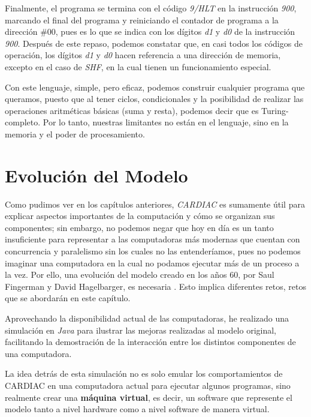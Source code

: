 \documentclass[letterpaper,12pt,oneside]{book}
\begin{document}
    Finalmente, el programa se termina con el código  \textit{9/HLT} en la instrucción \textit{900}, marcando el
	final del programa y reiniciando el contador de programa
	a la dirección \#00, pues es lo que se indica con los dígitos \textit{d1} y \textit{d0} de la instrucción \textit{900}. Después de este repaso, podemos constatar que, en casi todos los códigos de operación, los dígitos \textit{d1} y \textit{d0} hacen
	referencia a una dirección de memoria, excepto en el caso de \textit{SHF}, en la cual tienen un funcionamiento especial.
	
	Con este lenguaje, simple, pero eficaz, podemos construir cualquier programa que queramos,
	puesto que al tener ciclos, condicionales y la posibilidad de realizar
	las operaciones aritméticas básicas (suma y resta), podemos
	decir que es Turing-completo. Por lo tanto, nuestras limitantes no están en el lenguaje, sino en la memoria y el poder de procesamiento.
	
	
	

	\clearpage	
	
\chapter{Evolución del Modelo}  %

	Como pudimos ver en los capítulos anteriores, \textit{CARDIAC} es sumamente útil para explicar aspectos importantes de la computación y cómo se organizan sus 	
	componentes; sin embargo, no podemos negar que hoy en día es un tanto insuficiente para representar a las computadoras más modernas que cuentan con
	concurrencia y paralelismo sin los cuales no las entenderíamos, pues no podemos imaginar una computadora en la cual no podamos 	
	ejecutar más de un proceso a la vez. Por ello, una evolución del modelo creado en los años 60, por Saul Fingerman y David Hagelbarger,  es
	necesaria \cite{fingerman_instruction_1968}. Esto implica diferentes retos, retos que se abordarán en este capítulo.
	
	Aprovechando
	la disponibilidad actual de las computadoras, he realizado una simulación en \textit{Java} para ilustrar las mejoras realizadas al modelo
	original, facilitando la demostración de la interacción entre los distintos componentes de una computadora.
 
    La idea detrás de esta simulación
	no es solo emular los comportamientos de CARDIAC en una computadora actual para ejecutar algunos programas,
	sino realmente crear una \textbf{máquina virtual}, es decir, un software que represente
	el modelo tanto a nivel hardware como a nivel software de manera virtual.
 
\end{document}
